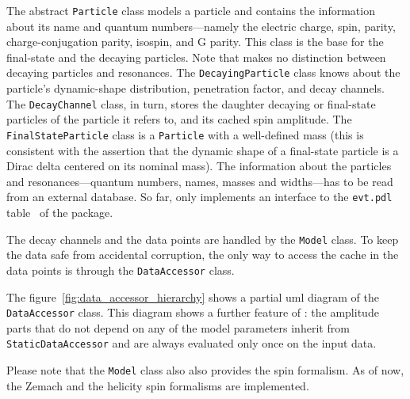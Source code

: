     The abstract \lstinline!Particle! class models a particle and contains the information about its name and quantum numbers---namely the electric charge, spin, parity, charge-conjugation parity, isospin, and G parity.
    This class is the base for the final-state and the decaying particles.
    Note that  makes no distinction between decaying particles and resonances.
    The \lstinline!DecayingParticle! class knows about the particle's dynamic-shape distribution, penetration factor, and decay channels.
    The \lstinline!DecayChannel! class, in turn, stores the daughter decaying or final-state particles of the particle it refers to, and its cached spin amplitude.
    The \lstinline!FinalStateParticle! class is a \lstinline!Particle! with a well-defined mass (this is consistent with the assertion that the dynamic shape of a final-state particle is a Dirac delta centered on its nominal mass).
    The information about the particles and resonances---quantum numbers, names, masses and widths---has to be read from an external database.
    So far,  only implements an interface to the \texttt{evt.pdl} table~\cite[p.~13]{evtgen_manual} of the  package.


    The decay channels and the data points are handled by the \lstinline!Model! class.
    To keep the data safe from accidental corruption, the only way to access the cache in the data points is through the \lstinline!DataAccessor! class.
    \begin{sidewaysfigure}
        \centering
        
        \caption{A simplified \ac{uml} diagram that shows some of the daughter classes of \lstinline!DataAccessor!.}
        \label{fig:data_accessor_hierarchy}
    \end{sidewaysfigure}
    The figure~\ref{fig:data_accessor_hierarchy} shows a partial \ac{uml} diagram of the \lstinline!DataAccessor! class.
    This diagram shows a further feature of : the amplitude parts that do not depend on any of the model parameters inherit from \lstinline!StaticDataAccessor! and are always evaluated only once on the input data.


    Please note that the \lstinline!Model! class also also provides the spin formalism.
    As of now, the Zemach and the helicity spin formalisms are implemented.


